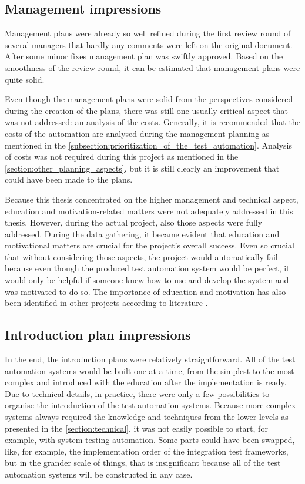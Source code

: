\subsection{Management impressions}
Management plans were already so well refined during the first review round of several managers that hardly any comments were left on the original document. After some minor fixes management plan was swiftly approved. Based on the smoothness of the review round, it can be estimated that management plans were quite solid.

Even though the management plans were solid from the perspectives considered during the creation of the plans, there was still one usually critical aspect that was not addressed: an analysis of the costs. Generally, it is recommended that the costs of the automation are analysed during the management planning as mentioned in the \autoref{subsection:prioritization_of_the_test_automation}. Analysis of costs was not required during this project as mentioned in the \autoref{section:other_planning_aspects}, but it is still clearly an improvement that could have been made to the plans.

Because this thesis concentrated on the higher management and technical aspect, education and motivation-related matters were not adequately addressed in this thesis. However, during the actual project, also those aspects were fully addressed. During the data gathering, it became evident that education and motivational matters are crucial for the project's overall success. Even so crucial that without considering those aspects, the project would automatically fail because even though the produced test automation system would be perfect, it would only be helpful if someone knew how to use and develop the system and was motivated to do so. The importance of education and motivation has also been identified in other projects according to literature \cite{graham2012experiences}.

\subsection{Introduction plan impressions}
In the end, the introduction plans were relatively straightforward. All of the test automation systems would be built one at a time, from the simplest to the most complex and introduced with the education after the implementation is ready. Due to technical details, in practice, there were only a few possibilities to organise the introduction of the test automation systems. Because more complex systems always required the knowledge and techniques from the lower levels as presented in the \autoref{section:technical}, it was not easily possible to start, for example, with system testing automation. Some parts could have been swapped, like, for example, the implementation order of the integration test frameworks, but in the grander scale of things, that is insignificant because all of the test automation systems will be constructed in any case.

